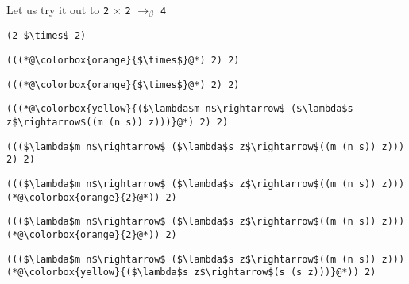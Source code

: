 \documentclass{beamer}
\begin{document}
\begin{frame}[fragile]{\CurrentSection}
\begin{block}{\CurrentSubSection}
Let us try it out to \texttt{2} $\times$ \texttt{2} $\rightarrow_\beta$ \texttt{4}
\end{block}


\end{frame}

\begin{frame}[fragile]{\CurrentSection}
\lstset{basicstyle=\ttfamily\small}\lstset{numbers=none}\lstset{language=ML}\begin{lstlisting}
(2 $\times$ 2)
\end{lstlisting}
\pause\lstset{language=ML}\begin{lstlisting}
(((*@\colorbox{orange}{$\times$}@*) 2) 2)
\end{lstlisting}

\end{frame}

\begin{frame}[fragile]{\CurrentSection}
\lstset{basicstyle=\ttfamily\small}\lstset{numbers=none}\lstset{language=ML}\begin{lstlisting}
(((*@\colorbox{orange}{$\times$}@*) 2) 2)
\end{lstlisting}
\pause\lstset{language=ML}\begin{lstlisting}
(((*@\colorbox{yellow}{($\lambda$m n$\rightarrow$ ($\lambda$s z$\rightarrow$((m (n s)) z)))}@*) 2) 2)
\end{lstlisting}

\end{frame}

\begin{frame}[fragile]{\CurrentSection}
\lstset{basicstyle=\ttfamily\small}\lstset{numbers=none}\lstset{language=ML}\begin{lstlisting}
((($\lambda$m n$\rightarrow$ ($\lambda$s z$\rightarrow$((m (n s)) z))) 2) 2)
\end{lstlisting}
\pause\lstset{language=ML}\begin{lstlisting}
((($\lambda$m n$\rightarrow$ ($\lambda$s z$\rightarrow$((m (n s)) z))) (*@\colorbox{orange}{2}@*)) 2)
\end{lstlisting}

\end{frame}

\begin{frame}[fragile]{\CurrentSection}
\lstset{basicstyle=\ttfamily\small}\lstset{numbers=none}\lstset{language=ML}\begin{lstlisting}
((($\lambda$m n$\rightarrow$ ($\lambda$s z$\rightarrow$((m (n s)) z))) (*@\colorbox{orange}{2}@*)) 2)
\end{lstlisting}
\pause\lstset{language=ML}\begin{lstlisting}
((($\lambda$m n$\rightarrow$ ($\lambda$s z$\rightarrow$((m (n s)) z))) (*@\colorbox{yellow}{($\lambda$s z$\rightarrow$(s (s z)))}@*)) 2)
\end{lstlisting}

\end{frame}
\end{document}
